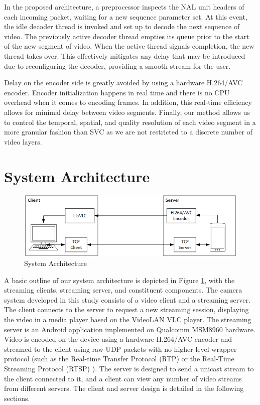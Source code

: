 In the proposed architecture, a preprocessor inspects the NAL unit headers of each incoming packet, waiting for a new sequence parameter set. At this event, the idle decoder thread is invoked and set up to decode the next sequence of video. The previously active decoder thread empties its queue prior to the start of the new segment of video. When the active thread signals completion, the new thread takes over. This effectively mitigates any delay that may be introduced due to reconfiguring the decoder, providing a smooth stream for the user.

Delay on the encoder side is greatly avoided by using a hardware H.264/AVC encoder. Encoder initialization happens in real time and there is no CPU overhead when it comes to encoding frames. In addition, this real-time efficiency allows for minimal delay between video segments. Finally, our method allows us to control the temporal, spatial, and quality resolution of each video segment in a more granular fashion than SVC as we are not restricted to a discrete number of video layers.  


\section{System Architecture}
\label{sec:Architecture}
\begin{figure}[ht]
\centering
\includegraphics[width=0.7\linewidth]{images/SystemArchitecture.png}
\caption{System Architecture}
\label{fig:SystemArchitecture}
\end{figure}

A basic outline of our system architecture is depicted in Figure \ref{fig:SystemArchitecture}, with the streaming clients, streaming server, and constituent components. The camera system developed in this study consists of a video client and a streaming server. The client connects to the server to request a new streaming session, displaying the video in a media player based on the VideoLAN VLC player. The streaming server is an Android application implemented on Qualcomm MSM8960 hardware. Video is encoded on the device using a hardware H.264/AVC encoder and streamed to the client using raw UDP packets with no higher level wrapper protocol (such as the Real-time Transfer Protocol (RTP) \cite{RTP} or the Real-Time Streaming Protocol (RTSP) \cite{RTSP}). The server is designed to send a unicast stream to the client connected to it, and a client can view any number of video streams from different servers. The client and server design is detailed in the following sections.

